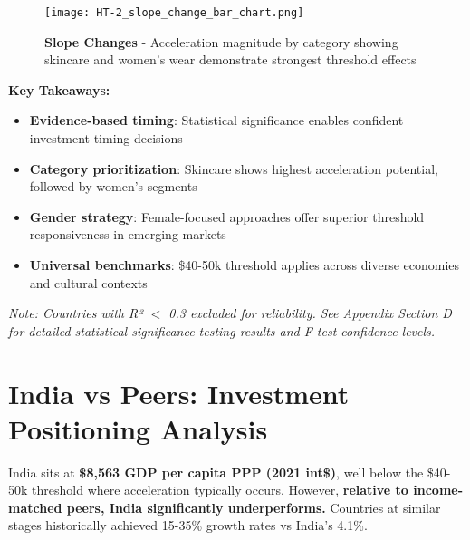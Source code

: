 \documentclass[11pt]{article}
\begin{document}
\begin{figure}[H]
\centering
\texttt{[image: HT-2\_slope\_change\_bar\_chart.png]}
\caption{\textbf{Slope Changes} - Acceleration magnitude by category showing skincare and women's wear demonstrate strongest threshold effects}
\end{figure}


\textbf{Key Takeaways:}
\vspace{-5pt}
\begin{itemize}
    \setlength{\itemsep}{-2pt}
    \item \textbf{Evidence-based timing}: Statistical significance enables confident investment timing decisions
    \item \textbf{Category prioritization}: Skincare shows highest acceleration potential, followed by women's segments
    \item \textbf{Gender strategy}: Female-focused approaches offer superior threshold responsiveness in emerging markets
    \item \textbf{Universal benchmarks}: \$40-50k threshold applies across diverse economies and cultural contexts
\end{itemize}
\textit{Note: Countries with R² $<$ 0.3 excluded for reliability.} \textit{See Appendix Section D for detailed statistical significance testing results and F-test confidence levels.}

\section{India vs Peers: Investment Positioning Analysis}

India sits at \textbf{\$8,563 GDP per capita PPP (2021 int\$)}, well below the \$40-50k threshold where acceleration typically occurs. However, \textbf{relative to income-matched peers, India significantly underperforms.} Countries at similar stages historically achieved 15-35\% growth rates vs India's 4.1\%.
\end{document}

